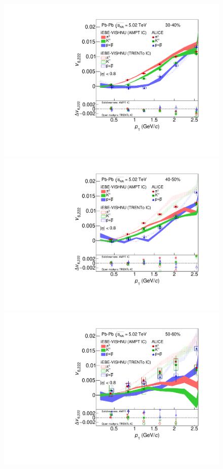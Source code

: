 \begin{figure}[!htb]
\begin{center}
\includegraphics[scale=0.26]{figures/model/TrentoAndAMPT_v6222_gap00_new_30-40_PID2.pdf}
\includegraphics[scale=0.26]{figures/model/TrentoAndAMPT_v6222_gap00_new_40-50_PID2.pdf}
\includegraphics[scale=0.26]{figures/model/TrentoAndAMPT_v6222_gap00_new_50-60_PID2.pdf}

\end{center}
\end{figure}

